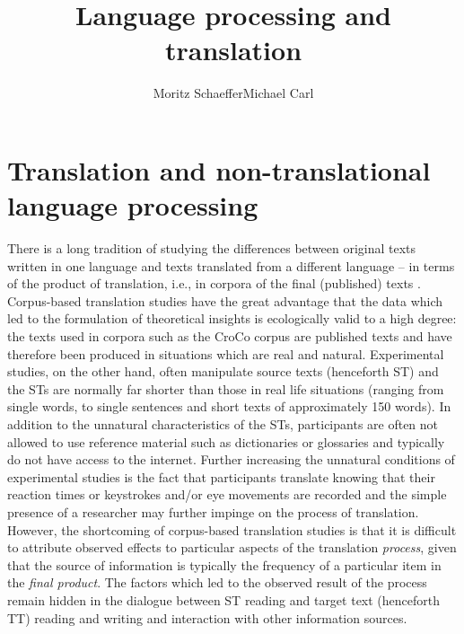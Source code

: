 \documentclass[output=paper]{LSP/langsci}
\author{Moritz Schaeffer\affiliation{Johannes Gutenberg University of Mainz}\lastand Michael Carl\affiliation{Renmin University of China}}
\title{Language processing and translation}
\begin{document}
\section{Translation and non-translational language processing} 
There is a long tradition of studying the differences between original texts written in one language and texts translated from a different language -- in terms of the product of translation, i.e., in corpora of the final (published) texts \citep[e.g.][]{476033}. Corpus-based translation studies have the great advantage that the data which led to the formulation of theoretical insights is ecologically valid to a high degree: the texts used in corpora such as the CroCo corpus \citep{476033} are published texts and have therefore been produced in situations which are real and natural. Experimental studies, on the other hand, often manipulate source texts (henceforth ST) and the STs are normally far shorter than those in real life situations (ranging from single words, to single sentences and short texts of approximately 150 words). In addition to the unnatural characteristics of the STs, participants are often not allowed to use reference material such as dictionaries or glossaries and typically do not have access to the internet. Further increasing the unnatural conditions of experimental studies is the fact that participants translate knowing that their reaction times or keystrokes and\slash or eye movements are recorded and the simple presence of a researcher may further impinge on the process of translation. However, the shortcoming of corpus-based translation studies is that it is difficult to attribute observed effects to particular aspects of the translation \textit{process}, given that the source of information is typically the frequency of a particular item in the \textit{final product}. The factors which led to the observed result of the process remain hidden in the dialogue between ST reading and target text (henceforth TT) reading and writing and interaction with other information sources.
\end{document}
